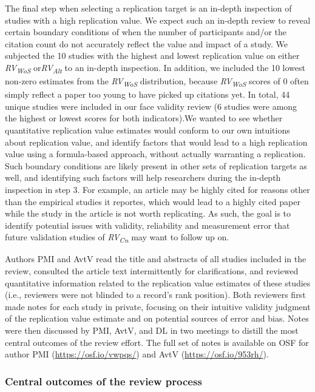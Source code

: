 \documentclass[
  man,floatsintext]{apa6}
\begin{document}
The final step when selecting a replication target is an in-depth inspection of studies with a high replication value. We expect such an in-depth review to reveal certain boundary conditions of when the number of participants and/or the citation count do not accurately reflect the value and impact of a study. We subjected the 10 studies with the highest and lowest replication value on either \emph{RV\textsubscript{WoS}} or\emph{RV\textsubscript{Alt}} to an in-depth inspection. In addition, we included the 10 lowest non-zero estimates from the \emph{RV\textsubscript{WoS}} distribution, because \emph{RV\textsubscript{WoS}} scores of 0 often simply reflect a paper too young to have picked up citations yet. In total, 44 unique studies were included in our face validity review (6 studies were among the highest or lowest scores for both indicators).We wanted to see whether quantitative replication value estimates would conform to our own intuitions about replication value, and identify factors that would lead to a high replication value using a formula-based approach, without actually warranting a replication. Such boundary conditions are likely present in other sets of replication targets as well, and identifying such factors will help researchers during the in-depth inspection in step 3. For example, an article may be highly cited for reasons other than the empirical studies it reportes, which would lead to a highly cited paper while the study in the article is not worth replicating. As such, the goal is to identify potential issues with validity, reliability and measurement error that future validation studies of \emph{RV\textsubscript{Cn}} may want to follow up on.

Authors PMI and AvtV read the title and abstracts of all studies included in the review, consulted the article text intermittently for clarifications, and reviewed quantitative information related to the replication value estimates of these studies (i.e., reviewers were not blinded to a record's rank position). Both reviewers first made notes for each study in private, focusing on their intuitive validity judgment of the replication value estimate and on potential sources of error and bias. Notes were then discussed by PMI, AvtV, and DL in two meetings to distill the most central outcomes of the review effort. The full set of notes is available on OSF for author PMI (\url{https://osf.io/vwpqs/}) and AvtV (\url{https://osf.io/953rh/}).

\hypertarget{central-outcomes-of-the-review-process}{%
\subsubsection{Central outcomes of the review process}\label{central-outcomes-of-the-review-process}}
\end{document}

